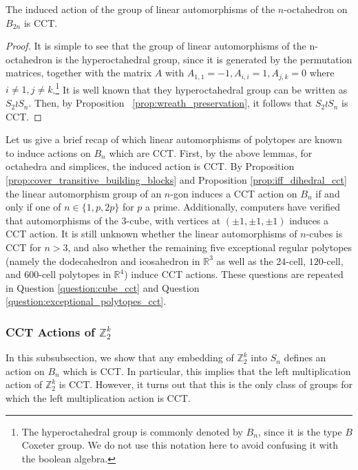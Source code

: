 \documentclass[smallextended]{svjour3}       %
\numberwithin{equation}{section}
\newcommand\sssec{\subsubsection}
\begin{document}
\begin{proposition}
The induced action of the group of linear automorphisms of the $n$-octahedron on $B_{2n}$ is CCT.
\end{proposition}
\begin{proof}
It is simple to see that the group of linear automorphisms of the n-octahedron is the hyperoctahedral group, since it is generated by the permutation matrices, together with the matrix $A$ with $A_{1,1} = -1,A_{i,i} = 1,A_{j,k} = 0$ where $i \neq 1, j \neq k$.\footnote{The hyperoctahedral group is commonly denoted by $B_n$, since it is the type $B$ Coxeter group. We do not use this notation here to avoid confusing it with the boolean algebra.} It is well known that they hyperoctahedral group can be written as $S_2 \wr S_n$. Then, by Proposition ~\ref{prop:wreath_preservation}, it follows that $S_2 \wr S_n$ is CCT.
\end{proof}

\begin{remark}
Let us give a brief recap of which linear automorphisms of polytopes are known to induce actions on $B_n$ which are CCT. First, by the above lemmas, for octahedra and simplices, the induced action is CCT. By Proposition  \ref{prop:cover_transitive_building_blocks} and Proposition \ref{prop:iff_dihedral_cct} the linear automorphism group of an $n$-gon induces a CCT action on $B_n$ if and only if one of $n\in \{1,p,2p\}$ for $p$ a prime. Additionally, computers have verified that automorphisms of the 3-cube, with vertices at $(\pm 1,\pm 1,\pm 1)$ induces a CCT action. It is still unknown whether the linear automorphisms of $n$-cubes is CCT for $n> 3$, and also whether the remaining five exceptional regular polytopes (namely the dodecahedron and icosahedron in $\mathbb R^3$ as well as the $24$-cell, $120$-cell, and $600$-cell polytopes in $\mathbb R^4$) induce CCT actions. These questions are repeated in Question \ref{question:cube_cct} and Question \ref{question:exceptional_polytopes_cct}.

\end{remark}

\sssec{CCT Actions of $\mathbb Z_2^k$}

In this subsubsection, we show that any embedding of $\mathbb Z_2^k$ into $S_n$ defines an action on $B_n$ which is CCT. In particular, this implies that the left multiplication action of $\mathbb Z_2^k$ is CCT. However, it turns out that this is the only class of groups for which the left multiplication action is CCT.
\end{document}
